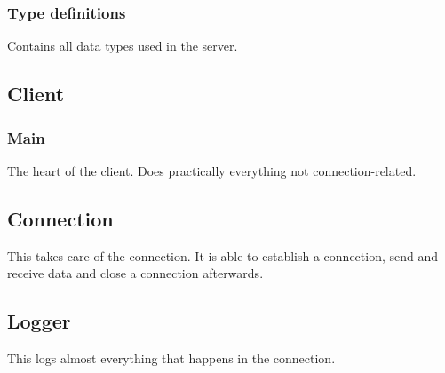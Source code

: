 \documentclass[a4paper]{article}
\begin{document}


\subsubsection{Type definitions}
Contains all data types used in the server.


\subsection{Client}
\subsubsection{Main}
The heart of the client. Does practically everything not connection-related.


%

\subsection{Connection}
This takes care of the connection. It is able to establish a connection, send
and receive data and close a connection afterwards.




\subsection{Logger}
This logs almost everything that happens in the connection.



\end{document}

